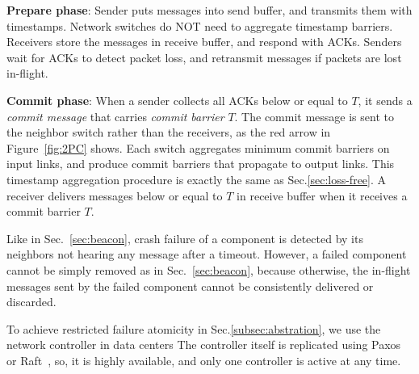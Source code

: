 \begin{ecompact}
\item \textbf{Prepare phase}: Sender puts messages into send buffer, and transmits them with timestamps. Network switches do NOT need to aggregate timestamp barriers. Receivers store the messages in receive buffer, and respond with ACKs. Senders wait for ACKs to detect packet loss, and retransmit messages if packets are lost in-flight.
\item \textbf{Commit phase}: When a sender collects all ACKs below or equal to $T$, it sends a \emph{commit message} that carries \emph{commit barrier} $T$. The commit message is sent to the neighbor switch rather than the receivers, as the red arrow in Figure~\ref{fig:2PC} shows. Each switch aggregates minimum commit barriers on input links, and produce commit barriers that propagate to output links. This timestamp aggregation procedure is exactly the same as Sec.\ref{sec:loss-free}. A receiver delivers messages below or equal to $T$ in receive buffer when it receives a commit barrier $T$.
\end{ecompact}



Like in Sec.~\ref{sec:beacon}, crash failure of a component is detected by its neighbors not hearing any message after a timeout.
However, a failed component cannot be simply removed as in Sec.~\ref{sec:beacon}, because otherwise, the in-flight messages sent by the failed component cannot be consistently delivered or discarded.

To achieve restricted failure atomicity in Sec.\ref{subsec:abstration}, we use the network controller in data centers 
The controller itself is replicated using Paxos~\cite{lamport1998part} or Raft~\cite{raft}, so, it is highly available, and only one controller is active at any time.


